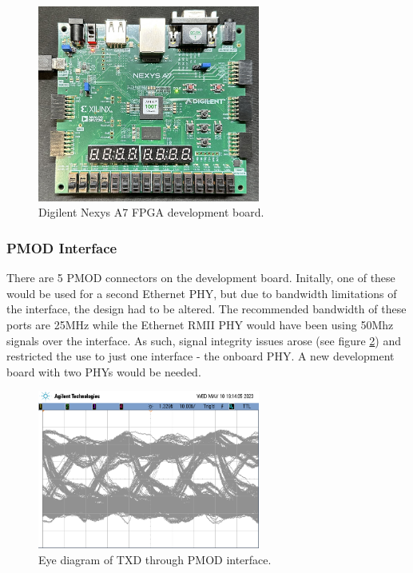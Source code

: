 \begin{figure}[h!]
    \centering
    \includegraphics[width=0.65\textwidth]{Images/nexysa7_board.jpg}
    \caption[Digilent Nexys A7 FPGA development board]{Digilent Nexys A7 FPGA development board.}
    \label{fig:fpga_dev_board}
\end{figure}

\newpage







\subsubsection{PMOD Interface}

There are 5 PMOD connectors on the development board. Initally, one of these would be used for a second Ethernet PHY, but due to bandwidth limitations of the interface, the design had to be altered. The recommended bandwidth of these ports are 25MHz while the Ethernet RMII PHY would have been using 50Mhz signals over the interface. As such, signal integrity issues arose (see figure \ref{fig:eye_diagram}) and restricted the use to just one interface - the onboard PHY. A new development board with two PHYs would be needed.

\begin{figure}[h]
    \centering
    \includegraphics[width=0.65\textwidth]{Images/EyeDiagramTX.png}
    \caption[Eye diagram of TXD through PMOD interface]{Eye diagram of TXD through PMOD interface.}
    \label{fig:eye_diagram}
\end{figure}








